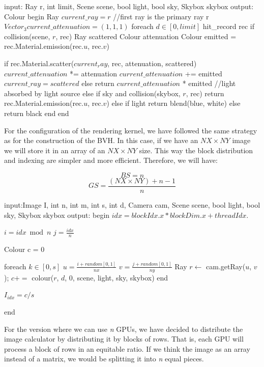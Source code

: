 \documentclass[titlepage,12pt]{report}
\begin{document}
\begin{algorithm}[caption={colour recursive}, label={color_alg_it}]
input: Ray r, int limit, Scene scene, bool light, bool sky, Skybox skybox
output: Colour
begin
  Ray $current\_ray = r$ //first ray is the primary ray r
  $Vector_3 current\_attenuation = (1,1,1)$
  foreach $d \in [0,limit]$
    hit_record rec
    if collision(scene, $r$, rec)
      Ray scattered
      Colour attenuation
      Colour emitted = rec.Material.emission(rec.$u$, rec.$v$)
      
      if rec.Material.scatter($current_ray$, rec, attenuation, scattered)
        $current\_attenuation$ *= attenuation 
        $current\_attenuation$ += emitted
        $current\_ray = scattered$
      else
        return $current\_attenuation$ * emitted //light absorbed by light source
    else
      if sky and collision(skybox, $r$, rec)
        return rec.Material.emission(rec.$u$, rec.$v$)
      else
        if light
          return blend(blue, white)
        else
          return black      
  end
end
\end{algorithm}

For the configuration of the rendering kernel, we have followed the same strategy as for the construction of the BVH. In this case, if we have an $NX \times NY$ image we will store it in an array of an $NX \times NY$ size. This way the block distribution and indexing are simpler and more efficient. Therefore, we will have:

$$
BS = n
$$
$$
GS = \frac{(NX \times NY) + n - 1}{n}
$$

\begin{algorithm}[caption={kernel renderer GPU}, label={renderer_gpu_par_alg}]
input:Image I,  int n, int m, int s, int d, Camera cam, Scene scene, bool light, bool sky, Skybox skybox
output:
begin
  $idx = blockIdx.x * blockDim.x + threadIdx.$ 
  
  $i = idx \bmod n $
  $j = \frac{idx}{n} $
  
  Colour c = 0
  
  foreach $k \in [0,s] $
    $u = \frac{i + random[0,1]}{nx}$
    $v = \frac{j + random[0,1]}{ny}$
    Ray $r \gets $ cam.getRay($u$, $v$);      
    $c += $ colour($r$, $d$, $0$, scene, light, sky, skybox)
  end    

   $I_{idx} = c/s$  
  
end
\end{algorithm}

For the version where we can use \textit{n} GPUs, we have decided to distribute the image calculator by distributing it by blocks of rows. That is, each GPU will process a block of rows in an equitable ratio. If we think the image as an array instead of a matrix, we would be splitting it into \textit{n} equal pieces.
\end{document}

